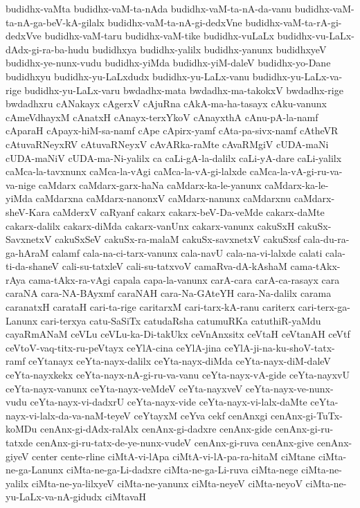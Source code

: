 {budidhx-vaMta
budidhx-vaM-ta-nAda
budidhx-vaM-ta-nA-da-vanu
budidhx-vaM-ta-nA-ga-beV-kA-gilalx
budidhx-vaM-ta-nA-gi-dedxVne
budidhx-vaM-ta-rA-gi-dedxVve
budidhx-vaM-taru
budidhx-vaM-tike
budidhx-vuLaLx
budidhx-vu-LaLx-dAdx-gi-ra-ba-hudu
budidhxya
budidhx-yalilx
budidhx-yanunx
budidhxyeV
budidhx-ye-nunx-vudu
budidhx-yiMda
budidhx-yiM-daleV
budidhx-yo-Dane
budidhxyu
budidhx-yu-LaLxdudx
budidhx-yu-LaLx-vanu
budidhx-yu-LaLx-va-rige
budidhx-yu-LaLx-varu
bwdadhx-mata
bwdadhx-ma-takokxV
bwdadhx-rige
bwdadhxru
cANakayx
cAgerxV
cAjuRna
cAkA-ma-ha-tasayx
cAku-vanunx
cAmeVdhayxM
cAnatxH
cAnayx-terxYkoV
cAnayxthA
cAnu-pA-la-namf
cAparaH
cApayx-hiM-sa-namf
cApe
cApirx-yamf
cAta-pa-sivx-namf
cAtheVR
cAtuvaRNeyxRV
cAtuvaRNeyxV
cAvARka-raMte
cAvaRMgiV
cUDA-maNi
cUDA-maNiV
cUDA-ma-Ni-yalilx
ca
caLi-gA-la-dalilx
caLi-yA-dare
caLi-yalilx
caMca-la-tavxnunx
caMca-la-vAgi
caMca-la-vA-gi-lalxde
caMca-la-vA-gi-ru-va-va-nige
caMdarx
caMdarx-garx-haNa
caMdarx-ka-le-yanunx
caMdarx-ka-le-yiMda
caMdarxna
caMdarx-nanonxV
caMdarx-nanunx
caMdarxnu
caMdarx-sheV-Kara
caMderxV
caRyanf
cakarx
cakarx-beV-Da-veMde
cakarx-daMte
cakarx-dalilx
cakarx-diMda
cakarx-vanUnx
cakarx-vanunx
cakuSxH
cakuSx-SavxnetxV
cakuSxSeV
cakuSx-ra-malaM
cakuSx-savxnetxV
cakuSxsf
cala-du-ra-ga-hAraM
calamf
cala-na-ci-tarx-vanunx
cala-navU
cala-na-vi-lalxde
calati
cala-ti-da-shaneV
cali-su-tatxleV
cali-su-tatxvoV
camaRva-dA-kAshaM
cama-tAkx-rAya
cama-tAkx-ra-vAgi
capala
capa-la-vanunx
carA-cara
carA-ca-rasayx
cara
caraNA
cara-NA-BAyxmf
caraNAH
cara-Na-GAteYH
cara-Na-dalilx
carama
caranatxH
carataH
cari-ta-rige
caritarxM
cari-tarx-kA-ranu
cariterx
cari-terx-ga-Lanunx
cari-terxya
catu-SaSiTx
catudaRsha
catumuRKa
catuthiR-yaMdu
cayaRmANaM
ceVLu
ceVLu-ka-Di-takUkx
ceVnAnxsitx
ceVtaH
ceVtanAH
ceVtf
ceVtoV-vaq-titx-ru-peVtayx
ceYlA-cina
ceYlA-jina
ceYlA-ji-na-ku-shoV-tatx-ramf
ceYtanayx
ceYta-nayx-dalilx
ceYta-nayx-diMda
ceYta-nayx-diM-daleV
ceYta-nayxkekx
ceYta-nayx-nA-gi-ru-va-vanu
ceYta-nayx-vA-gide
ceYta-nayxvU
ceYta-nayx-vanunx
ceYta-nayx-veMdeV
ceYta-nayxveV
ceYta-nayx-ve-nunx-vudu
ceYta-nayx-vi-dadxrU
ceYta-nayx-vide
ceYta-nayx-vi-lalx-daMte
ceYta-nayx-vi-lalx-da-va-naM-teyeV
ceYtayxM
ceYva
cekf
cenAnxgi
cenAnx-gi-TuTx-koMDu
cenAnx-gi-dAdx-ralAlx
cenAnx-gi-dadxre
cenAnx-gide
cenAnx-gi-ru-tatxde
cenAnx-gi-ru-tatx-de-ye-nunx-vudeV
cenAnx-gi-ruva
cenAnx-give
cenAnx-giyeV
center
cente-rline
ciMtA-vi-lApa
ciMtA-vi-lA-pa-ra-hitaM
ciMtane
ciMta-ne-ga-Lanunx
ciMta-ne-ga-Li-dadxre
ciMta-ne-ga-Li-ruva
ciMta-nege
ciMta-ne-yalilx
ciMta-ne-ya-lilxyeV
ciMta-ne-yanunx
ciMta-neyeV
ciMta-neyoV
ciMta-ne-yu-LaLx-va-nA-gidudx
ciMtavaH
}
